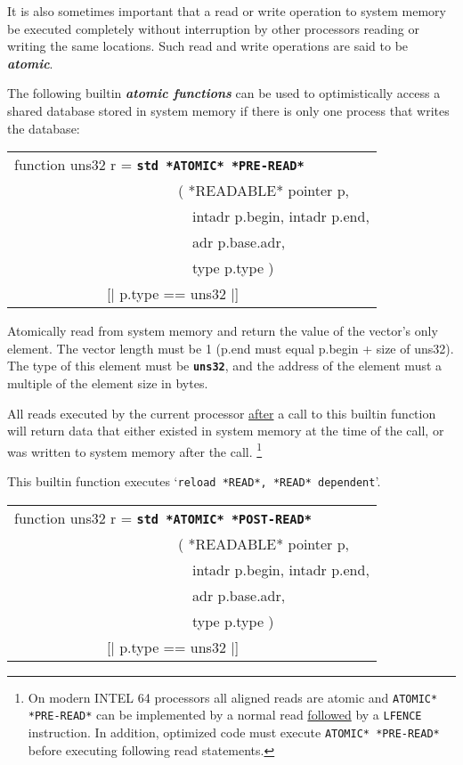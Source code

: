 \documentclass[12pt]{article}
\makeatletter
\newcommand{\TT}[1]{{\tt \bfseries #1}}
\newcommand{\key}[1]{{\bf \em #1}\index{#1}}
\newcommand{\skey}[2]{{\bf \em #1#2}\index{#1}}
\newcommand{\ttstdkey}[1]{\TT{std #1}\index{#1@{\tt std #1}}}
\newenvironment{indpar}[1][0.3in]%
	{\begin{list}{}%
		     {\setlength{\itemsep}{0in}%
		      \setlength{\topsep}{0in}%
		      \setlength{\parsep}{1ex}%
		      \setlength{\labelwidth}{#1}%
		      \setlength{\leftmargin}{#1}%
		      \addtolength{\leftmargin}{\labelsep}}%
	 \item}%
	{\end{list}}
\makeatother
\begin{document}
It is also sometimes important that a read or write operation to
system memory be executed completely without interruption by
other processors reading or writing the same locations.  Such
read and write operations are said to be \key{atomic}.

The following builtin \skey{atomic function}s
can be used to optimistically access a shared database stored
in system memory if there is only one process that writes the database:

\begin{indpar}

{\tt\begin{tabular}{@{}l}
function uns32 r = \ttstdkey{*ATOMIC* *PRE-READ*} \\
~~~~~~~~~~~~~~~~~~~~~~~( *READABLE* pointer p, \\
~~~~~~~~~~~~~~~~~~~~~~~~~intadr p.begin, intadr p.end, \\
~~~~~~~~~~~~~~~~~~~~~~~~~adr p.base.adr, \\
~~~~~~~~~~~~~~~~~~~~~~~~~type p.type ) \\
~~~~~~~~~~~~~[| p.type == uns32 |] \\
\end{tabular}}

\begin{indpar}
Atomically read
from system memory and return the value of the vector's only element.
The vector length must be 1 (p.end must equal p.begin + size of uns32).
The type of this element must be \TT{uns32}, and the address of the element
must a multiple of the element size in bytes.

All reads executed by the current processor \underline{after}
a call to this builtin function will return data that either
existed in system memory at the time of the call, or was written
to system memory after the call.%
\footnote{On modern INTEL 64 processors
all aligned reads are atomic and {\tt *ATOMIC* *PRE-READ*} can be implemented
by a normal read \underline{followed} by a {\tt LFENCE} instruction.
In addition, optimized code must execute
{\tt *ATOMIC* *PRE-READ*} before executing following read statements. }

This builtin function executes
`{\tt reload *READ*, *READ* dependent}'.
\end{indpar}

{\tt\begin{tabular}{@{}l}
function uns32 r = \ttstdkey{*ATOMIC* *POST-READ*} \\
~~~~~~~~~~~~~~~~~~~~~~~( *READABLE* pointer p, \\
~~~~~~~~~~~~~~~~~~~~~~~~~intadr p.begin, intadr p.end, \\
~~~~~~~~~~~~~~~~~~~~~~~~~adr p.base.adr, \\
~~~~~~~~~~~~~~~~~~~~~~~~~type p.type ) \\
~~~~~~~~~~~~~[| p.type == uns32 |] \\
\end{tabular}}


\end{indpar}
\end{document}

